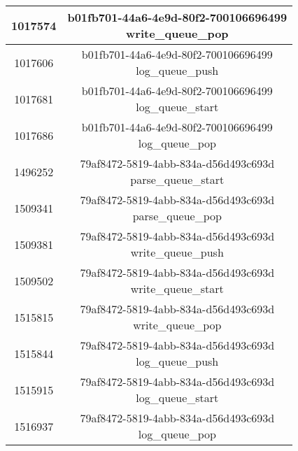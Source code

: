 \begin{table}[H]
\begin{tabular}{|c|c|}
		1017574 & \shortstack{b01fb701-44a6-4e9d-80f2-700106696499\\write\_queue\_pop}\\\hline
		1017606 & \shortstack{b01fb701-44a6-4e9d-80f2-700106696499\\log\_queue\_push}\\\hline
		1017681 & \shortstack{b01fb701-44a6-4e9d-80f2-700106696499\\log\_queue\_start}\\\hline
		1017686 & \shortstack{b01fb701-44a6-4e9d-80f2-700106696499\\log\_queue\_pop}\\\hline
		1496252 & \shortstack{79af8472-5819-4abb-834a-d56d493c693d\\parse\_queue\_start}\\\hline
		1509341 & \shortstack{79af8472-5819-4abb-834a-d56d493c693d\\parse\_queue\_pop}\\\hline
		1509381 & \shortstack{79af8472-5819-4abb-834a-d56d493c693d\\write\_queue\_push}\\\hline
		1509502 & \shortstack{79af8472-5819-4abb-834a-d56d493c693d\\write\_queue\_start}\\\hline
		1515815 & \shortstack{79af8472-5819-4abb-834a-d56d493c693d\\write\_queue\_pop}\\\hline
		1515844 & \shortstack{79af8472-5819-4abb-834a-d56d493c693d\\log\_queue\_push}\\\hline
		1515915 & \shortstack{79af8472-5819-4abb-834a-d56d493c693d\\log\_queue\_start}\\\hline
		1516937 & \shortstack{79af8472-5819-4abb-834a-d56d493c693d\\log\_queue\_pop}\\\hline
	\end{tabular}
\end{table}
\clearpage
